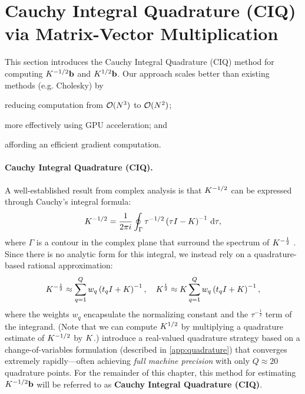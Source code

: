 \section{Cauchy Integral Quadrature (CIQ) via Matrix-Vector Multiplication}
\label{sec:ciq_method}

This section introduces the Cauchy Integral Quadrature (CIQ) method for computing $K^{-1/2} \mathbf{b}$ and $K^{1/2} \mathbf{b}$.
Our approach scales better than existing methods (e.g. Cholesky) by
\begin{enumerate*}
  \item reducing computation from $\bigo{N^3}$ to $\bigo{N^2}$;
  \item more effectively using GPU acceleration; and
  \item affording an efficient gradient computation.
\end{enumerate*}

\paragraph{Cauchy Integral Quadrature (CIQ).}
A well-established result from complex analysis is that $K^{-1/2}$ can be expressed through Cauchy's integral formula:
%
\[
	K^{-1 / 2} = \frac{1}{2 \pi i} \oint_\Gamma \tau^{- 1 / 2} \left( \tau I - K \right)^{-1} \,\mathrm{d}{\tau},
\]
%
where $\Gamma$ is a contour in the complex plane that surround the spectrum of $K^{-\frac 1 2}$ \citep{davies2005computing,hale2008computing,golub2012matrix}.
Since there is no analytic form for this integral, we instead rely on a quadrature-based rational approximation:
%
\begin{equation}
	K^{-\frac 1 2} \approx \sum_{q=1}^Q w_q \left( t_q I + K \right)^{-1},
  \quad
	K^{\frac 1 2} \approx K \sum_{q=1}^Q w_q \left( t_q I + K \right)^{-1},
	\label{eqn:contour_integral_quad}
\end{equation}
%
where the weights $w_q$ encapsulate the normalizing constant and the $\tau^{-\frac 1 2}$ term of the integrand.
(Note that we can compute $K^{1/2}$ by multiplying a quadrature estimate of $K^{-1/2}$ by $K$.)
\citet{hale2008computing} introduce a real-valued quadrature strategy based on a change-of-variables formulation (described in \cref{app:quadrature})
that converges extremely rapidly---often achieving \emph{full machine precision} with only $Q \approx 20$ quadrature points.
For the remainder of this chapter, this method for estimating $K^{-1/2} \mathbf{b}$  will be referred to as {\bf Cauchy Integral Quadrature (CIQ)}.



